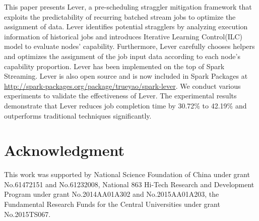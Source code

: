 \documentclass[10pt,conference,compsocconf,letterpaper]{IEEEtran}
\begin{document}
  This paper presents Lever, a pre-scheduling straggler mitigation framework that exploits the predictability of recurring batched stream jobs to optimize the assignment of data. Lever identifies potential stragglers by analyzing execution information of historical jobs and introduces Iterative Learning Control(ILC) model to evaluate nodes' capability. Furthermore, Lever carefully chooses helpers and optimizes the assignment of the job input data according to each node's capability proportion. Lever has been implemented on the top of Spark Streaming. Lever is also open source and is now included in Spark Packages at \url{http://spark-packages.org/package/trueyao/spark-lever}. We conduct various experiments to validate the effectiveness of Lever. The experimental results demonstrate that Lever reduces job completion time by 30.72\% to 42.19\% and outperforms traditional techniques significantly.

\section*{Acknowledgment}
  This work was supported by National Science Foundation of China under grant No.61472151 and No.61232008, National 863 Hi-Tech Research and Development Program under grant No.2014AA01A302 and No.2015AA01A203, the Fundamental Research Funds for the Central Universities under grant No.2015TS067.



\end{document}
